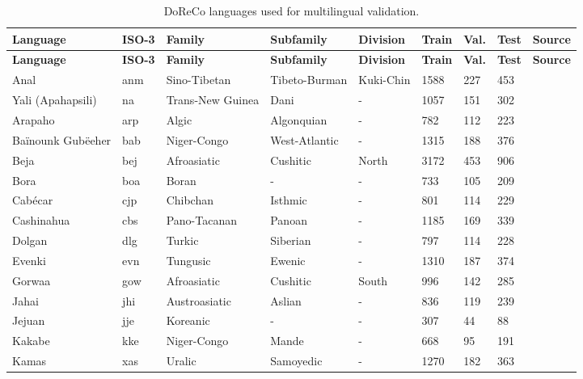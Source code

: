 \begingroup
\small
\setlength{\tabcolsep}{3pt}
\renewcommand{\arraystretch}{0.92}
\begin{longtable}{lllllllll}
\caption{DoReCo languages used for multilingual validation.}\label{tab:doreco_languages}\\
\toprule
\textbf{Language} & \textbf{ISO-3} & \textbf{Family} & \textbf{Subfamily} & \textbf{Division} & \textbf{Train} & \textbf{Val.} & \textbf{Test} & \textbf{Source} \\
\midrule
\endfirsthead
\toprule
\textbf{Language} & \textbf{ISO-3} & \textbf{Family} & \textbf{Subfamily} & \textbf{Division} & \textbf{Train} & \textbf{Val.} & \textbf{Test} & \textbf{Source} \\
\midrule
\endhead
\bottomrule
\endfoot
Anal & anm & Sino-Tibetan & Tibeto-Burman & Kuki-Chin & 1588 & 227 & 453 & \citet{doreco_anal1239} \\
Yali (Apahapsili) & na & Trans-New Guinea & Dani & - & 1057 & 151 & 302 & \citet{doreco_apah1238} \\
Arapaho & arp & Algic & Algonquian & - & 782 & 112 & 223 & \citet{doreco_arap1274} \\
Baïnounk Gubëeher & bab & Niger-Congo & West-Atlantic & - & 1315 & 188 & 376 & \citet{doreco_bain1259} \\
Beja & bej & Afroasiatic & Cushitic & North & 3172 & 453 & 906 & \citet{doreco_beja1238} \\
Bora & boa & Boran & - & - & 733 & 105 & 209 & \citet{doreco_bora1263} \\
Cabécar & cjp & Chibchan & Isthmic & - & 801 & 114 & 229 & \citet{doreco_cabe1245} \\
Cashinahua & cbs & Pano-Tacanan & Panoan & - & 1185 & 169 & 339 & \citet{doreco_cash1254} \\
Dolgan & dlg & Turkic & Siberian & - & 797 & 114 & 228 & \citet{doreco_dolg1241} \\
Evenki & evn & Tungusic & Ewenic & - & 1310 & 187 & 374 & \citet{doreco_even1259} \\
Gorwaa & gow & Afroasiatic & Cushitic & South & 996 & 142 & 285 & \citet{doreco_goro1270} \\
Jahai & jhi & Austroasiatic & Aslian & - & 836 & 119 & 239 & \citet{doreco_jeha1242} \\
Jejuan & jje & Koreanic & - & - & 307 & 44 & 88 & \citet{doreco_jeju1234} \\
Kakabe & kke & Niger-Congo & Mande & - & 668 & 95 & 191 & \citet{doreco_kaka1265} \\
Kamas & xas & Uralic & Samoyedic & - & 1270 & 182 & 363 & \citet{doreco_kama1351} \\

\end{longtable}
